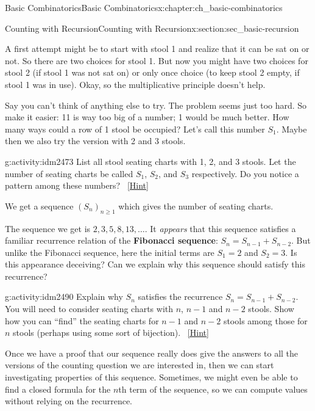 \documentclass[oneside,10pt,]{book}
\newcommand{\terminology}[1]{\textbf{#1}}
\numberwithin{equation}{chapter}
\begin{document}
\begin{chapterptx}{Basic Combinatorics}{}{Basic Combinatorics}{}{}{x:chapter:ch_basic-combinatorics}
\begin{sectionptx}{Counting with Recursion}{}{Counting with Recursion}{}{}{x:section:sec_basic-recursion}
\begin{introduction}{}
\par
A first attempt might be to start with stool 1 and realize that it can be sat on or not.  So there are two choices for stool 1.  But now you might have two choices for stool 2 (if stool 1 was not sat on) or only once choice (to keep stool 2 empty, if stool 1 was in use).  Okay, so the multiplicative principle doesn't help.%
\par
Say you can't think of anything else to try.  The problem seems just too hard.  So make it easier:  11 is way too big of a number; 1 would be much better.  How many ways could a row of 1 stool be occupied?  Let's call this number \(S_1\).  Maybe then we also try the version with 2 and 3 stools.%
\begin{activity}{}{g:activity:idm2473}%
List all stool seating charts with 1, 2, and 3 stools.  Let the number of seating charts be called \(S_1\), \(S_2\), and \(S_3\) respectively.  Do you notice a pattern among these numbers?%
\qquad~\hfill{\tiny\hyperlink{g:hint:idm2479-back}{[Hint]}}\end{activity}
We get a sequence \((S_n)_{n \ge 1}\) which gives the number of seating charts.%
\par
The sequence we get is \(2, 3, 5, 8, 13, \ldots\).  It \emph{appears} that this sequence satisfies a familiar recurrence relation of the \terminology{Fibonacci sequence}: \(S_n = S_{n-1} + S_{n-2}\).  But unlike the Fibonacci sequence, here the initial terms are \(S_1 = 2\) and \(S_2 = 3\).  Is this appearance deceiving?  Can we explain why this sequence should satisfy this recurrence?%
\begin{activity}{}{g:activity:idm2490}%
Explain why \(S_n\) satisfies the recurrence \(S_n = S_{n-1} + S_{n-2}\).  You will need to consider seating charts with \(n\), \(n-1\) and \(n-2\) stools.  Show how you can ``find'' the seating charts for \(n-1\) and \(n-2\) stools among those for \(n\) stools (perhaps using some sort of bijection).%
\qquad~\hfill{\tiny\hyperlink{g:hint:idm2502-back}{[Hint]}}\end{activity}
Once we have a proof that our sequence really does give the answers to all the versions of the counting question we are interested in, then  we can start investigating properties of this sequence.  Sometimes, we might even be able to find a closed formula for the \(n\)th term of the sequence, so we can compute values without relying on the recurrence.%
\end{introduction}%
%
%
\typeout{************************************************}

\end{sectionptx}
\end{chapterptx}
\end{document}

